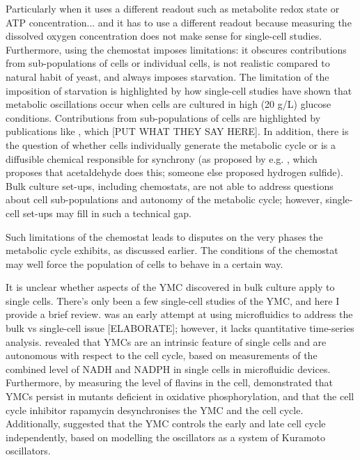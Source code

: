 Particularly when it uses a different readout such as metabolite redox state or ATP concentration... and it has to use a different readout because measuring the dissolved oxygen concentration does not make sense for single-cell studies.
Furthermore, using the chemostat imposes limitations: it obscures contributions from sub-populations of cells or individual cells, is not realistic compared to natural habit of yeast, and always imposes starvation.
The limitation of the imposition of starvation is highlighted by how single-cell studies have shown that metabolic oscillations occur when cells are cultured in high (20 g/L) glucose conditions.
Contributions from sub-populations of cells are highlighted by publications like \citet{burnettiCellCycleStart2016}, which [PUT WHAT THEY SAY HERE].
In addition, there is the question of whether cells individually generate the metabolic cycle or is a diffusible chemical responsible for synchrony (as proposed by e.g. \citet{krishnaMinimalPushPull2018}, which proposes that acetaldehyde does this; someone else proposed hydrogen sulfide).
Bulk culture set-ups, including chemostats, are not able to address questions about cell sub-populations and autonomy of the metabolic cycle; however, single-cell set-ups may fill in such a technical gap.

Such limitations of the chemostat leads to disputes on the very phases the metabolic cycle exhibits, as discussed earlier.
The conditions of the chemostat may well force the population of cells to behave in a certain way.

It is unclear whether aspects of the YMC discovered in bulk culture apply to single cells.
There's only been a few single-cell studies of the YMC, and here I provide a brief review.
\citet{laxmanBehaviorMetabolicCycling2010} was an early attempt at using microfluidics to address the bulk vs single-cell issue [ELABORATE];
however, it lacks quantitative time-series analysis.
\citet{papagiannakisAutonomousMetabolicOscillations2017} revealed that YMCs are an intrinsic feature of single cells and are autonomous with respect to the cell cycle, based on measurements of the combined level of NADH and NADPH in single cells in microfluidic devices.
Furthermore, by measuring the level of flavins in the cell, \citet{baumgartnerFlavinbasedMetabolicCycles2018} demonstrated that YMCs persist in mutants deficient in oxidative phosphorylation, and that the cell cycle inhibitor rapamycin desynchronises the YMC and the cell cycle.
Additionally, \citet{ozsezenInferenceHighLevelInteraction2019} suggested that the YMC controls the early and late cell cycle independently, based on modelling the oscillators as a system of Kuramoto oscillators.

